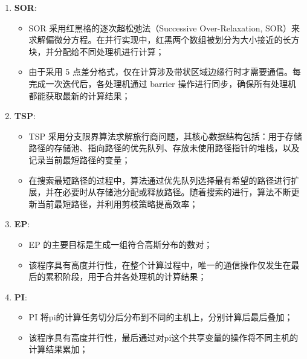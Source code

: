 {\begin{enumerate}[leftmargin=1em, align=left]
\begin{itemize}[leftmargin=*, nosep]
                  \item 排序过程包括三个主要步骤：首先，每个处理机统计其私有“桶”中 key 的数量；然后，在锁保护的临界区内，将这些计数累加到公用“桶”中；最后，根据公用“桶”中的信息构造出一个有序数组；
              \end{itemize}
        \item \textbf{SOR}:
              \begin{itemize}[leftmargin=*, nosep]
                  \item SOR 采用红黑格的逐次超松弛法（Successive Over-Relaxation, SOR）来求解偏微分方程。在并行实现中，红黑两个数组被划分为大小接近的长方块，并分配给不同处理机进行计算；
                  \item 由于采用 5 点差分格式，仅在计算涉及带状区域边缘行时才需要通信。每完成一次迭代后，各处理机通过 barrier 操作进行同步，确保所有处理机都能获取最新的计算结果；
              \end{itemize}
        \item \textbf{TSP}:
              \begin{itemize}[leftmargin=*, nosep]
                  \item TSP 采用分支限界算法求解旅行商问题，其核心数据结构包括：用于存储路径的存储池、指向路径的优先队列、存放未使用路径指针的堆栈，以及记录当前最短路径的变量；
                  \item 在搜索最短路径的过程中，算法通过优先队列选择最有希望的路径进行扩展，并在必要时从存储池分配或释放路径。随着搜索的进行，算法不断更新当前最短路径，并利用剪枝策略提高效率；
              \end{itemize}
        \item \textbf{EP}:
              \begin{itemize}[leftmargin=*, nosep]
                  \item EP 的主要目标是生成一组符合高斯分布的数对；
                  \item 该程序具有高度并行性，在整个计算过程中，唯一的通信操作仅发生在最后的累积阶段，用于合并各处理机的计算结果；
              \end{itemize}
        \item \textbf{PI}:
              \begin{itemize}[leftmargin=*, nosep]
                  \item PI 将pi的计算任务切分后分布到不同的主机上，分别计算后最后叠加；
                  \item 该程序具有高度并行性，最后通过对pi这个共享变量的操作将不同主机的计算结果累加；
              \end{itemize}
    \end{enumerate}

}
